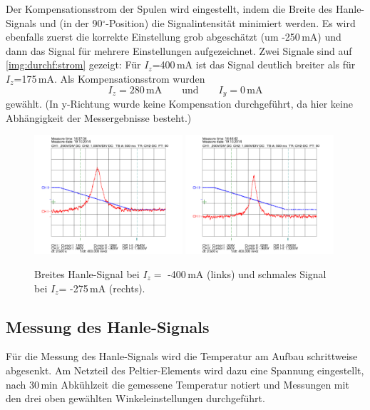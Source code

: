 Der Kompensationsstrom der Spulen wird eingestellt, indem die Breite des Hanle-Signals und
(in der 90$^\circ$-Position) die Signalintensität minimiert werden.
Es wird ebenfalls zuerst die korrekte Einstellung grob abgeschätzt (um -250\,mA)
und dann das Signal für mehrere Einstellungen aufgezeichnet.
Zwei Signale sind auf \autoref{img:durchf:strom} gezeigt:
Für $I_z$=400\,mA ist das Signal deutlich breiter als für $I_z$=175\,mA.
Als Kompensationsstrom wurden 
\begin{equation}
\label{eq:calcurr}
 I_z=280\,\text{mA} \qquad \text{und} \qquad I_y=0\,\text{mA}
\end{equation}
gewählt. (In y-Richtung wurde keine Kompensation durchgeführt,
da hier keine Abhängigkeit der Messergebnisse besteht.)
\begin{figure}[H]
\begin{center}
  \includegraphics[width=0.49\textwidth]{../data/2/-17_5X-40.png}
    \includegraphics[width=0.49\textwidth]{../data/2/-17_5X-27_5.png}
  \caption{Breites Hanle-Signal bei $I_z=$ -400\,mA (links) und schmales Signal bei $I_z$= -275\,mA (rechts).}
  \label{img:durchf:strom}
\end{center}
\end{figure}



\subsection{Messung des Hanle-Signals}

Für die Messung des Hanle-Signals wird die Temperatur am Aufbau schrittweise abgesenkt.
Am Netzteil des Peltier-Elements wird dazu eine Spannung eingestellt, nach 30\,min Abkühlzeit
die gemessene Temperatur notiert und Messungen mit den drei oben gewählten Winkeleinstellungen durchgeführt.



